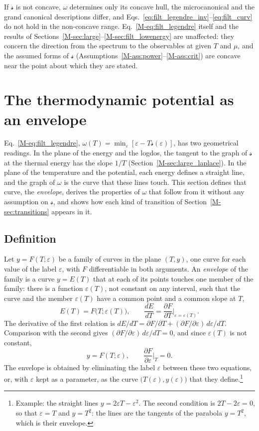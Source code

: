 \documentclass[10pt,a4paper]{article}
\theoremstyle{plain}
\theoremstyle{remark}
\newcommand{\lndos}{{logdos}}  %
\newcommand{\lds}{\mathscr{s}}  %
\begin{document}
If $\lds$ is not concave, $\omega$ determines only its concave hull, the
microcanonical and the grand canonical descriptions differ, and
Eqs.~\eqref{eq:filt_legendre_inv}--\eqref{eq:filt_curv} do not hold in the
non-concave range. Eq.~\eqref{M-eq:filt_legendre} itself and the results of
Sections~\ref{M-sec:large}--\ref{M-sec:filt_lowenergy} are unaffected: they
concern the direction from the spectrum to the observables at given $T$ and
$\mu$, and the assumed forms of $\lds$
(Assumptions~\ref{M-ass:power}--\ref{M-ass:crit}) are concave near the point
about which they are stated.

\section{The thermodynamic potential as an envelope}
\label{app:envelope}

Eq.~\eqref{M-eq:filt_legendre}, $\omega(T)=\min_\varepsilon[\varepsilon-T\lds(\varepsilon)]$,
has two geometrical readings. In the plane of the energy and the \lndos{},
the tangent to the graph of $\lds$ at the thermal energy has the slope $1/T$
(Section~\ref{M-sec:large_laplace}). In the plane of the temperature and
the potential, each energy defines a straight line, and the graph of
$\omega$ is the curve that these lines touch. This section defines that
curve, the \emph{envelope}, derives the properties of $\omega$ that follow
from it without any assumption on $\lds$, and shows how each kind of
transition of Section~\ref{M-sec:transitions} appears in it.

\subsection{Definition}
\label{sec:env_def}

Let $y=F(T;\varepsilon)$ be a family of curves in the plane $(T,y)$, one
curve for each value of the label $\varepsilon$, with $F$ differentiable in
both arguments. An \emph{envelope} of the family is a curve $y=E(T)$ that
at each of its points touches one member of the family: there is a function
$\varepsilon(T)$, not constant on any interval, such that the curve and the
member $\varepsilon(T)$ have a common point and a common slope at $T$,
\[
  E(T)=F\big(T;\varepsilon(T)\big) ,\qquad
  \frac{dE}{dT}=\frac{\partial F}{\partial T}\bigg|_{\varepsilon=\varepsilon(T)} .
\]
The derivative of the first relation is
$dE/dT=\partial F/\partial T+(\partial F/\partial\varepsilon)\,d\varepsilon/dT$.
Comparison with the second gives
$(\partial F/\partial\varepsilon)\,d\varepsilon/dT=0$, and since
$\varepsilon(T)$ is not constant,
\begin{equation}\label{eq:env_cond}
  y=F(T;\varepsilon) ,\qquad \frac{\partial F}{\partial\varepsilon}\bigg|_{T}=0 .
\end{equation}
The envelope is obtained by eliminating the label $\varepsilon$ between
these two equations, or, with $\varepsilon$ kept as a parameter, as the
curve $\big(T(\varepsilon),y(\varepsilon)\big)$ that they define.\footnote{Example:
the straight lines $y=2\varepsilon T-\varepsilon^{2}$. The second condition
is $2T-2\varepsilon=0$, so that $\varepsilon=T$ and $y=T^{2}$: the lines are
the tangents of the parabola $y=T^{2}$, which is their envelope.}
\end{document}
